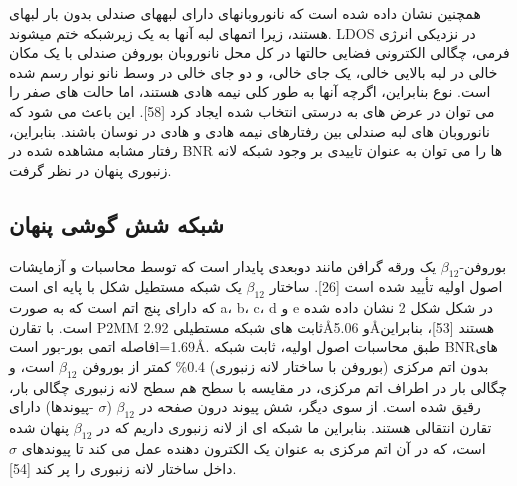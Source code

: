 همچنین نشان داده شده است که نانوروبانهای دارای لبههای صندلی بدون بار لبهای هستند، زیرا اتمهای لبه آنها به یک زیرشبکه ختم میشوند. LDOS در نزدیکی انرژی فرمی، چگالی الکترونی فضایی حالتها در کل محل نانوروبان بوروفن صندلی با یک مکان خالی در لبه بالایی خالی، یک جای خالی، و دو جای خالی در وسط نانو نوار رسم شده است. نوع بنابراین، اگرچه آنها به طور کلی نیمه هادی هستند، اما حالت های صفر را می توان در عرض های به درستی انتخاب شده ایجاد کرد [58]. این باعث می شود که نانوروبان های لبه صندلی بین رفتارهای نیمه هادی و هادی در نوسان باشند. بنابراین، رفتار مشابه مشاهده شده در BNR ها را می توان به عنوان تاییدی بر وجود شبکه لانه زنبوری پنهان در نظر گرفت.

\subsection{شبکه شش گوشی پنهان}
بوروفن-$\beta_{12}$ یک ورقه گرافن مانند دوبعدی پایدار است که توسط محاسبات و آزمایشات اصول اولیه تأیید شده است [26]. ساختار $\beta_{12}$ یک شبکه مستطیل شکل با پایه ای است که دارای پنج اتم است که به صورت a، b، c، d و e در شکل  شکل 2 نشان داده شده است. با تقارن P2MM ثابت های شبکه مستطیلی 2.92\AA و 5.06\AA هستند [53]، بنابراین فاصله اتمی بور-بور استl=1.69\AA. طبق محاسبات اصول اولیه، ثابت شبکه BNRهای بدون اتم مرکزی (بوروفن با ساختار لانه زنبوری) 0.4\% کمتر از بوروفن $\beta_{12}$ است، و چگالی بار در اطراف اتم مرکزی، در مقایسه با سطح هم سطح لانه زنبوری چگالی بار، رقیق شده است. از سوی دیگر، شش پیوند درون صفحه در $\beta_{12}$ ($\sigma$ -پیوندها) دارای تقارن انتقالی هستند. بنابراین ما شبکه ای از لانه زنبوری داریم که در $\beta_{12}$ پنهان شده است، که در آن اتم مرکزی به عنوان یک الکترون دهنده عمل می کند تا پیوندهای $\sigma$ داخل ساختار لانه زنبوری را پر کند [54]. 


